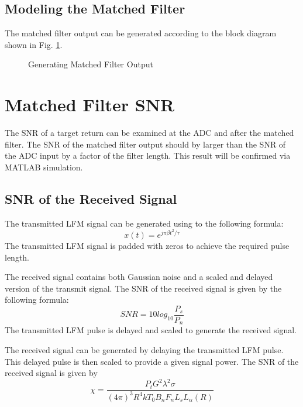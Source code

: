 \documentclass[12pt,letterpaper]{article}
\begin{document}
\subsection{Modeling the Matched Filter}
The matched filter output can be generated according to the block diagram shown in Fig. \ref{Generate MF Output}.
\begin{figure}[H]
\caption{Generating Matched Filter Output}
\label{Generate MF Output}
\end{figure}
\section{Matched Filter SNR}
The SNR of a target return can be examined at the ADC and after the matched filter. The SNR of the matched filter output should by larger than the SNR of the ADC input by a factor of the filter length. This result will be confirmed via MATLAB simulation.
\subsection{SNR of the Received Signal}
The transmitted LFM signal can be generated using to the following formula:
\begin{equation}
x(t) = e^{j\pi \beta t^2/\tau}
\end{equation}
The transmitted LFM signal is padded with zeros to achieve the required pulse length.

\noindent
The received signal contains both Gaussian noise and a scaled and delayed version of the transmit signal. The SNR of the received signal is given by the following formula:
\begin{equation}
SNR = 10log_{10}\frac{P_s}{P_n}
\end{equation}
The transmitted LFM pulse is delayed and scaled to generate the received signal.

The received signal can be generated by delaying the transmitted LFM pulse. This delayed pulse is then scaled to provide a given signal power.
The SNR of the received signal is given by
\begin{equation}
\chi = \frac{P_t G^2 \lambda^2 \sigma}{(4\pi)^3 R^4 k T_0 B_n F_n L_s L_\alpha(R)}
\end{equation}
\end{document}
